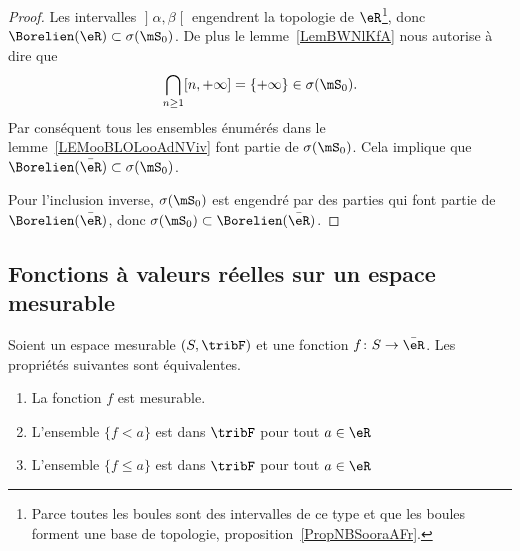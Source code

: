 \begin{proof}
	Les intervalles \( \mathopen] \alpha , \beta \mathclose[\) engendrent la topologie de \( \eR\)\footnote{Parce toutes les boules sont des intervalles de ce type et que les boules forment une base de topologie, proposition~\ref{PropNBSooraAFr}.}, donc \( \Borelien(\eR)\subset\sigma(\mS_0)\). De plus le lemme~\ref{LemBWNlKfA} nous autorise à dire que
	\begin{equation}
		\bigcap_{n\geq 1}\mathopen[ n , +\infty \mathclose]=\{ +\infty \}\in\sigma(\mS_0).
	\end{equation}
	Par conséquent tous les ensembles énumérés dans le lemme~\ref{LEMooBLOLooAdNViv} font partie de \( \sigma(\mS_0)\). Cela implique que \( \Borelien(\bar\eR)\subset\sigma(\mS_0)\).

	Pour l'inclusion inverse, \( \sigma(\mS_0)\) est engendré par des parties qui font partie de \( \Borelien(\bar \eR)\), donc \( \sigma(\mS_0)\subset\Borelien(\bar \eR)\).
\end{proof}

\subsection{Fonctions à valeurs réelles sur un espace mesurable}

\begin{theorem}     \label{THOooWHFLooKYGsOm}
	Soient un espace mesurable \( (S,\tribF)\) et une fonction \( f\colon S\to \bar \eR\). Les propriétés suivantes sont équivalentes.
	\begin{enumerate}
		\item\label{ITEMooHAMHooYLqUhVi}
		La fonction \( f\) est mesurable.
		\item\label{ITEMooHAMHooYLqUhVii}
		L'ensemble \( \{ f<a \}\) est dans \( \tribF\) pour tout \( a\in \eR\)
		\item\label{ITEMooHAMHooYLqUhViii}
		L'ensemble \( \{ f\leq a \}\) est dans \( \tribF\) pour tout \( a\in \eR\)
	\end{enumerate}
\end{theorem}

